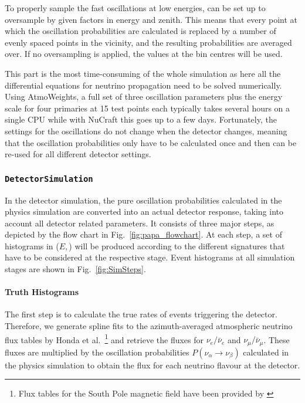 
To properly sample the fast oscillations at low energies, \papa can be set up
to oversample by given factors in energy and zenith. This means that every
point at which the oscillation probabilities are calculated is replaced by a
number of evenly spaced points in the vicinity, and the resulting probabilities
are averaged over. If no oversampling is applied, the values at the bin
centres will be used.

This part is the most time-consuming of the whole simulation as here all the
differential equations for neutrino propagation need to be solved numerically.
Using AtmoWeights, a full set of three oscillation parameters plus the energy
scale for four primaries at 15 test points each typically takes several hours
on a single CPU while with NuCraft this goes up to a few days. Fortunately, the
settings for the oscillations do not change when the detector changes, meaning
that the oscillation probabilities only have to be calculated once and then can
be re-used for all different detector settings.


\subsubsection{\texttt{DetectorSimulation}}

In the detector simulation, the pure oscillation probabilities calculated in the
physics simulation are converted into an actual detector response, taking into
account all detector related parameters. It consists of three major steps, as
depicted by the flow chart in Fig.~\ref{fig:papa_flowchart}. At each step, a set
of histograms in ($E$,\,\coszen) will be produced according to the
different signatures that have to be considered at the respective stage. Event
histograms at all simulation stages are shown in Fig.~\ref{fig:SimSteps}.


\paragraph{Truth Histograms}

The first step is to calculate the true rates of events triggering the
detector. Therefore, we generate spline fits to the azimuth-averaged
atmospheric neutrino flux tables by Honda et al.\ \cite{Honda,
HondaSP}\footnote{Flux tables for the South Pole magnetic field
have been provided by \cite{HondaSP}} and retrieve the fluxes for
$\nu_e/\bar\nu_e$ and $\nu_\mu/\bar\nu_\mu$. These fluxes are multiplied by the
oscillation probabilities $P(\nu_\alpha \to \nu_\beta)$ calculated in the
physics simulation to obtain the flux for each neutrino flavour at the
detector.

